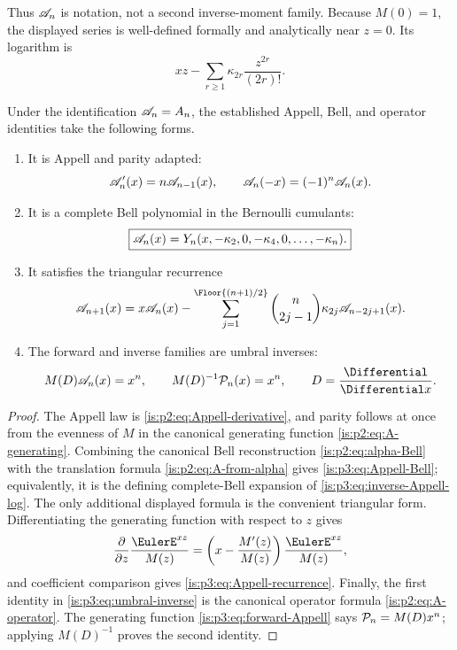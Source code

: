 Thus $\mathscr A_n$ is notation, not a second inverse-moment family.  Because
$M(0)=1$, the displayed series is well-defined formally and analytically near
$z=0$.  Its logarithm is
\begin{equation}
 xz-\sum_{r\ge1}\kappa_{2r}\frac{z^{2r}}{(2r)!}.
 \label{is:p3:eq:inverse-Appell-log}
\end{equation}

\begin{theorem}
\label{is:p3:thm:Appell-Bell}
Under the identification $\mathscr A_n=A_n$, the established Appell, Bell, and
operator identities take the following forms.
\begin{enumerate}
\item It is Appell and parity adapted:
\begin{equation}
 \mathscr A_n'(x)=n\mathscr A_{n-1}(x),
 \qquad
 \mathscr A_n(-x)=(-1)^n\mathscr A_n(x).
 \label{is:p3:eq:Appell-basic}
\end{equation}
\item It is a complete Bell polynomial in the Bernoulli cumulants:
\begin{equation}
 \boxed{\displaystyle
 \mathscr A_n(x)=Y_n(x,-\kappa_2,0,-\kappa_4,0,\ldots,-\kappa_n).}
 \label{is:p3:eq:Appell-Bell}
\end{equation}
\item It satisfies the triangular recurrence
\begin{equation}
 \Acal_{n+1}(x)
 =x\Acal_n(x)
 -\sum_{j=1}^{\Floor{(n+1)/2}}
 \binom n{2j-1}\kappa_{2j}\Acal_{n-2j+1}(x).
 \label{is:p3:eq:Appell-recurrence}
\end{equation}
\item The forward and inverse families are umbral inverses:
\begin{equation}
 M(D)\Acal_n(x)=x^n,
 \qquad
 M(D)^{-1}\Pcal_n(x)=x^n,
 \qquad D=\frac{\Differential}{\Differential x}.
 \label{is:p3:eq:umbral-inverse}
\end{equation}
\end{enumerate}
\end{theorem}

\begin{proof}
The Appell law is \eqref{is:p2:eq:Appell-derivative}, and parity follows at
once from the evenness of $M$ in the canonical generating function
\eqref{is:p2:eq:A-generating}.  Combining the canonical Bell reconstruction
\eqref{is:p2:eq:alpha-Bell} with the translation formula
\eqref{is:p2:eq:A-from-alpha} gives \eqref{is:p3:eq:Appell-Bell}; equivalently,
it is the defining complete-Bell expansion of
\eqref{is:p3:eq:inverse-Appell-log}.  The only additional displayed formula is
the convenient triangular form.  Differentiating the generating function
with respect to $z$ gives
\[
 \frac{\partial}{\partial z}\frac{\EulerE^{xz}}{M(z)}
 =\left(x-\frac{M'(z)}{M(z)}\right)\frac{\EulerE^{xz}}{M(z)},
\]
and coefficient comparison gives \eqref{is:p3:eq:Appell-recurrence}.  Finally,
the first identity in \eqref{is:p3:eq:umbral-inverse} is the canonical operator
formula \eqref{is:p2:eq:A-operator}.  The generating function
\eqref{is:p3:eq:forward-Appell} says $\mathcal P_n=M(D)x^n$; applying
$M(D)^{-1}$ proves the second identity.
\end{proof}

